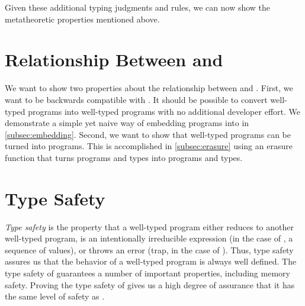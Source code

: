 Given these additional typing judgments and rules, we can now show the metatheoretic properties mentioned above.

\section{Relationship Between \wasm and \name}
We want to show two properties about the relationship between \wasm and \name.
First, we want \name to be backwards compatible with \wasm.
It should be possible to convert well-typed \wasm programs into well-typed \name programs with no additional developer effort.
We demonstrate a simple yet naive way of embedding \wasm programs into \name in \autoref{subsec:embedding}.
Second, we want to show that well-typed \name programs can be turned into \wasm programs.
This is accomplished in \autoref{subsec:erasure} using an erasure function that turns \name programs and types into \wasm programs and types.




\section{Type Safety}
\label{sec:typesafety}
\emph{Type safety} is the property that a well-typed program either reduces to another well-typed program, is an intentionally irreducible expression (in the case of \name, a sequence of values), or throws an error (trap, in the case of \name).
Thus, type safety assures us that the behavior of a well-typed program is always well defined.
The type safety of \wasm guarantees a number of important properties, including memory safety.
Proving the type safety of \name gives us a high degree of assurance that it has the same level of safety as \wasm.



